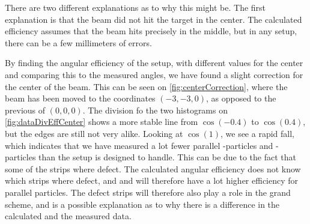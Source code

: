 There are two different explanations as to why this might be.
The first explanation is that the beam did not hit the target in the center. The calculated efficiency assumes that the beam hits precisely in the middle, but in any setup, there can be a few millimeters of errors. 

By finding the angular efficiency of the setup, with different values for the center and comparing this to the measured angles, we have found a slight correction for the center of the beam. This can be seen on \cref{fig:centerCorrection}, where the beam has been moved to the coordinates $(-3, -3, 0)$, as opposed to the previous of $(0, 0, 0)$. The division fo the two histograms on \cref{fig:dataDivEffCenter} shows a more stable line from $\cos(-0.4)$ to $\cos(0.4)$, but the edges are still not very alike. Looking at $\cos(1)$, we see a rapid fall, which indicates that we have measured a lot fewer parallel \be-particles and \al-particles than the setup is designed to handle. 
This can be due to the fact that some of the strips where defect. The calculated angular efficiency does not know which strips where defect, and and will therefore have a lot higher efficiency for parallel particles. The defect strips will therefore also play a role in the grand scheme, and is a possible explanation as to why there is a difference in the calculated and the measured data. 
